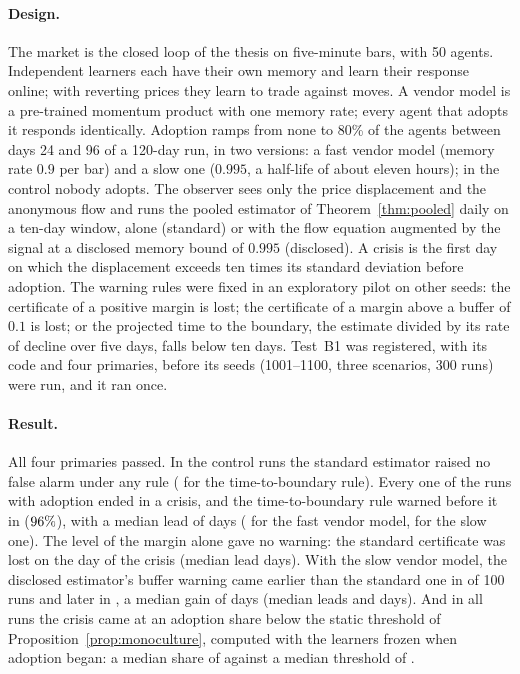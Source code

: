 
\paragraph{Design.} The market is the closed loop of the thesis on five-minute bars, with 50 agents. Independent learners each have their own memory and learn their response online; with reverting prices they learn to trade against moves. A vendor model is a pre-trained momentum product with one memory rate; every agent that adopts it responds identically. Adoption ramps from none to 80\% of the agents between days 24 and 96 of a 120-day run, in two versions: a fast vendor model (memory rate $0.9$ per bar) and a slow one ($0.995$, a half-life of about eleven hours); in the control nobody adopts. The observer sees only the price displacement and the anonymous flow and runs the pooled estimator of Theorem~\ref{thm:pooled} daily on a ten-day window, alone (standard) or with the flow equation augmented by the signal at a disclosed memory bound of $0.995$ (disclosed). A crisis is the first day on which the displacement exceeds ten times its standard deviation before adoption. The warning rules were fixed in an exploratory pilot on other seeds: the certificate of a positive margin is lost; the certificate of a margin above a buffer of $0.1$ is lost; or the projected time to the boundary, the estimate divided by its rate of decline over five days, falls below ten days. Test~B1 was registered, with its code and four primaries, before its seeds (1001--1100, three scenarios, 300 runs) were run, and it ran once.

\paragraph{Result.} All four primaries passed. In the \BoneControl{} control runs the standard estimator raised no false alarm under any rule (\BoneFA{} for the time-to-boundary rule). Every one of the \BoneRamp{} runs with adoption ended in a crisis, and the time-to-boundary rule warned before it in \BoneEarly{} ($96\%$), with a median lead of \BoneLead{} days (\BoneLeadFast{} for the fast vendor model, \BoneLeadSlow{} for the slow one). The level of the margin alone gave no warning: the standard certificate was lost on the day of the crisis (median lead \BoneLostLead{} days). With the slow vendor model, the disclosed estimator's buffer warning came earlier than the standard one in \BonePos{} of 100 runs and later in \BoneNeg{}, a median gain of \BoneGain{} days (median leads \BoneBufDiscSlow{} and \BoneBufStdSlow{} days). And in all \BoneBelowN{} runs the crisis came at an adoption share below the static threshold of Proposition~\ref{prop:monoculture}, computed with the learners frozen when adoption began: a median share of \BoneShareCrisis{} against a median threshold of \BoneStatic{}.

